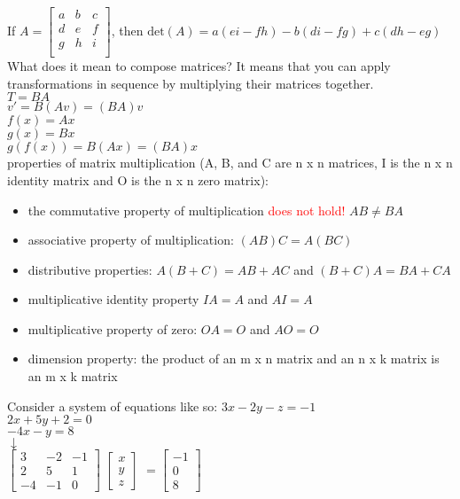 \documentclass{article}
\begin{document}
If
$ A = 
\begin{bmatrix}
a & b & c\\
d & e & f\\
g & h & i\\
\end{bmatrix}
$, then $\text{det}(A) = a(ei - fh) - b(di - fg) + c(dh - eg)$\\

What does it mean to compose matrices? It means that you can apply transformations in sequence by multiplying their matrices together.\\

$T = BA$\\
$v' = B(Av) = (BA)v$\\
$f(x) = Ax$\\
$g(x) = Bx$\\
$g(f(x)) = B(Ax) = (BA)x$\\

properties of matrix multiplication (A, B, and C are n x n matrices, I is the n x n identity matrix and O is the n x n zero matrix):
	\begin{itemize}
		\item the commutative property of multiplication \textcolor{red}{does not hold!} $AB \neq BA$
		\item associative property of multiplication: $(AB)C = A(BC)$
		\item distributive properties: $A(B + C) = AB + AC$ and $(B + C)A = BA + CA$
		\item multiplicative identity property $IA = A$ and $AI = A$
		\item multiplicative property of zero: $OA = O$ and $AO = O$
		\item dimension property: the product of an m x n matrix and an n x k matrix is an m x k matrix
	\end{itemize}

Consider a system of equations like so:
$3x - 2y - z = -1$\\
$2x + 5y + 2 = 0$\\
$-4x - y = 8$\\
$\downarrow$\\

$
\begin{bmatrix}
3 & -2 & -1\\
2 & 5 & 1\\
-4 & -1 & 0
\end{bmatrix}
$
$
\begin{bmatrix}
x\\
y\\
z
\end{bmatrix}
$
$
=
\begin{bmatrix}
-1\\
0\\
8
\end{bmatrix}
$\\\\
\end{document}

